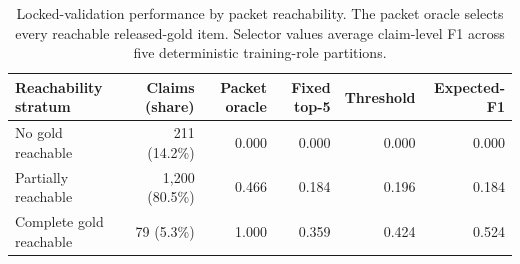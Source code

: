 \begin{table}[t]
\centering
\caption{Locked-validation performance by packet reachability. The packet oracle selects every reachable released-gold item. Selector values average claim-level F1 across five deterministic training-role partitions.}
\label{tab:reachability-strata}
\begin{tabular}{lrrrrr}
\toprule
Reachability stratum & Claims (share) & Packet oracle & Fixed top-5 & Threshold & Expected-F1 \\
\midrule
No gold reachable & 211 (14.2\%) & 0.000 & 0.000 & 0.000 & 0.000 \\
Partially reachable & 1,200 (80.5\%) & 0.466 & 0.184 & 0.196 & 0.184 \\
Complete gold reachable & 79 (5.3\%) & 1.000 & 0.359 & 0.424 & 0.524 \\
\bottomrule
\end{tabular}
\end{table}
